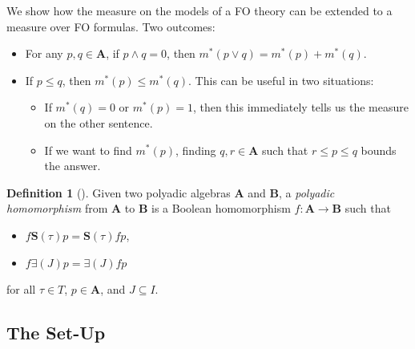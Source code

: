 \documentclass{article}
\theoremstyle{definition}
\newtheorem{definition}{Definition}
\theoremstyle{remark}
\begin{document}

We show how the measure on the models of a FO theory can be extended to a
measure over FO formulas. Two outcomes:
\begin{itemize}
\item For any $p, q \in \mathbf{A}$, if $p \land q = 0$, then $m^*(p \lor q) =
  m^*(p) + m^*(q)$.
\item If $p \le q$, then $m^*(p) \le m^*(q)$. This can be useful in two
  situations:
  \begin{itemize}
  \item If $m^*(q) = 0$ or $m^*(p) = 1$, then this immediately tells us the
    measure on the other sentence.
  \item If we want to find $m^*(p)$, finding $q, r \in \mathbf{A}$ such that $r
    \le p \le q$ bounds the answer.
  \end{itemize}
\end{itemize}

\begin{definition}[\cite{halmos2016algebraic}]
  Given two polyadic algebras $\mathbf{A}$ and $\mathbf{B}$, a \emph{polyadic
    homomorphism} from $\mathbf{A}$ to $\mathbf{B}$ is a Boolean homomorphism
  $f\colon \mathbf{A} \to \mathbf{B}$ such that
  \begin{itemize}
  \item $f\mathbf{S}(\tau)p = \mathbf{S}(\tau)fp$,
  \item $f\bm\exists(J)p = \bm\exists(J)fp$
  \end{itemize}
  for all $\tau \in T$, $p \in \mathbf{A}$, and $J \subseteq I$.
\end{definition}


\subsection{The Set-Up}

\end{document}
